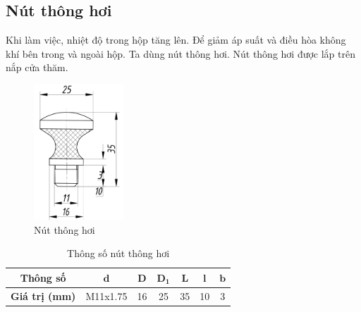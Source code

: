         \subsection{Nút thông hơi}
            \hspace*{0.6cm}Khi làm việc, nhiệt độ trong hộp tăng lên. Để giảm áp suất và điều hòa không khí bên trong và ngoài hộp. Ta dùng nút thông hơi. Nút thông hơi được lắp trên nắp cửa thăm.
            \begin{figure}[H]
                \centering
                \includegraphics[width=0.3\textwidth]{pictures/ven_plug.png}
                \caption{Nút thông hơi}
                \label{ven_plug}
            \end{figure} 
            \begin{table}[H]
                \centering
                \begin{tabular}{|c|c|c|c|c|c|c|}
                    \hline
                    \textbf{Thông số} & $\mathbf{d}$ & $\mathbf{D}$ & $\mathbf{D_1}$ & $\mathbf{L}$ & $\mathbf{l}$ & $\mathbf{b}$  \\
                    \hline
                    \textbf{Giá trị (mm)} & M11x1.75 & 16 & 25 & 35 & 10 & 3 \\
                    \hline 
                \end{tabular}     
                \caption{Thông số nút thông hơi}           
            \end{table}
